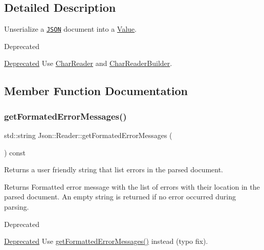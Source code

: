 \subsection{Detailed Description}
Unserialize a \href{http://www.json.org}{\tt J\+S\+ON} document into a \hyperlink{class_json_1_1_value}{Value}. 

\begin{DoxyRefDesc}{Deprecated}
\item[\hyperlink{deprecated__deprecated000005}{Deprecated}]Use \hyperlink{class_json_1_1_char_reader}{Char\+Reader} and \hyperlink{class_json_1_1_char_reader_builder}{Char\+Reader\+Builder}. \end{DoxyRefDesc}


\subsection{Member Function Documentation}
\mbox{\label{class_json_1_1_reader_a269793929575f925b629460c9c744da1}} 
\subsubsection{\texorpdfstring{get\+Formated\+Error\+Messages()}{getFormatedErrorMessages()}}
{\footnotesize\ttfamily std\+::string Json\+::\+Reader\+::get\+Formated\+Error\+Messages (\begin{DoxyParamCaption}{ }\end{DoxyParamCaption}) const}



Returns a user friendly string that list errors in the parsed document. 

\begin{DoxyReturn}{Returns}
Formatted error message with the list of errors with their location in the parsed document. An empty string is returned if no error occurred during parsing. 
\end{DoxyReturn}
\begin{DoxyRefDesc}{Deprecated}
\item[\hyperlink{deprecated__deprecated000006}{Deprecated}]Use \hyperlink{class_json_1_1_reader_a5e624688f0794da1e737d2a15aa5cb84}{get\+Formatted\+Error\+Messages()} instead (typo fix). \end{DoxyRefDesc}
\mbox{\label{class_json_1_1_reader_a5e624688f0794da1e737d2a15aa5cb84}} 
